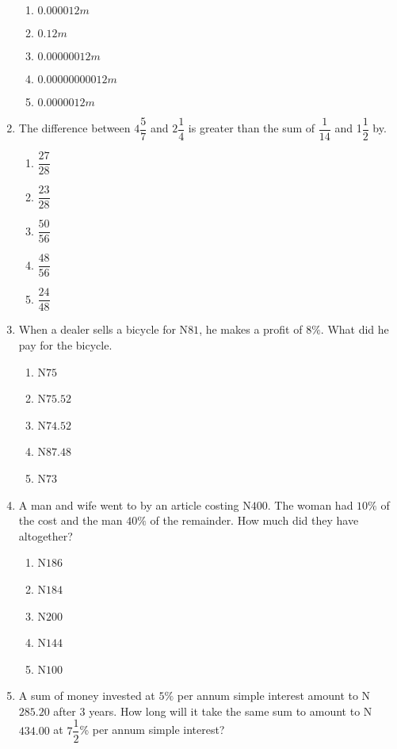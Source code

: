 \begin{multicols}{2}
\begin{enumerate}[label={\arabic*.}]
    \begin{enumerate}[label={\Alph*.}]
    \item \(0.000012m\)
    \item \(0.12m\)
    \item \(0.00000012m\)
    \item \(0.00000000012m\)
    \item \(0.0000012m\)
    \end{enumerate}
\item The difference between \(4{\dfrac{5}{7}}\) and \(2{\dfrac{1}{4}}\) is greater than the sum of \(\dfrac{1}{14}\) and 1\(\dfrac{1}{2}\) by.
    \begin{enumerate}[label={\Alph*.}]
    \item \(\dfrac{27}{28}\)
    \item \(\dfrac{23}{28}\)
    \item \(\dfrac{50}{56}\)
    \item \(\dfrac{48}{56}\)
    \item \(\dfrac{24}{48}\)
    \end{enumerate}
\item When a dealer sells a bicycle for N\(81\), he makes a profit of \(8\%\). What did he pay for the bicycle. 
    \begin{enumerate}[label={\Alph*.}]
    \item N\(75\)
    \item N\(75.52\)
    \item N\(74.52\)
    \item N\(87.48\)
    \item N\(73\)
    \end{enumerate}
\item A man and wife went to by an article costing N\(400\). The woman had \(10\%\) of the cost and the man \(40\%\) of the remainder. How much did they have altogether?
    \begin{enumerate}[label={\Alph*.}]
    \item N\(186\)
    \item N\(184\)
    \item N\(200\)
    \item N\(144\)
    \item N\(100\)
    \end{enumerate}
\item A sum of money invested at \(5\%\) per annum simple interest amount to N\(285.20\) after \(3\) years. How long will it take the same sum to amount to N\(434.00\) at \(7{\dfrac{1}{2}}\)\% per annum simple interest?

\end{enumerate}
\end{multicols}
